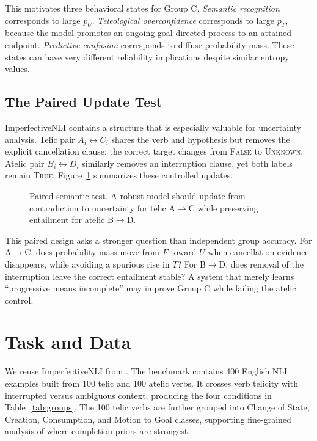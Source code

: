 \documentclass[letterpaper]{article}
\begin{document}
This motivates three behavioral states for Group C. \emph{Semantic recognition} corresponds to large $p_U$. \emph{Teleological overconfidence} corresponds to large $p_T$, because the model promotes an ongoing goal-directed process to an attained endpoint. \emph{Predictive confusion} corresponds to diffuse probability mass. These states can have very different reliability implications despite similar entropy values.

\subsection{The Paired Update Test}
ImperfectiveNLI contains a structure that is especially valuable for uncertainty analysis. Telic pair $A_i\leftrightarrow C_i$ shares the verb and hypothesis but removes the explicit cancellation clause: the correct target changes from \textsc{False} to \textsc{Unknown}. Atelic pair $B_i\leftrightarrow D_i$ similarly removes an interruption clause, yet both labels remain \textsc{True}. Figure~\ref{fig:pairwise} summarizes these controlled updates.

\begin{figure}[t]
\centering
\resizebox{\columnwidth}{!}{}
\caption{Paired semantic test. A robust model should update from contradiction to uncertainty for telic A$\rightarrow$C while preserving entailment for atelic B$\rightarrow$D.}
\label{fig:pairwise}
\end{figure}

This paired design asks a stronger question than independent group accuracy. For A$\rightarrow$C, does probability mass move from $F$ toward $U$ when cancellation evidence disappears, while avoiding a spurious rise in $T$? For B$\rightarrow$D, does removal of the interruption leave the correct entailment stable? A system that merely learns ``progressive means incomplete'' may improve Group C while failing the atelic control.

\section{Task and Data}
We reuse ImperfectiveNLI from \citet{ma-miyao-2026-imperfective}. The benchmark contains 400 English NLI examples built from 100 telic and 100 atelic verbs. It crosses verb telicity with interrupted versus ambiguous context, producing the four conditions in Table~\ref{tab:groups}. The 100 telic verbs are further grouped into Change of State, Creation, Consumption, and Motion to Goal classes, supporting fine-grained analysis of where completion priors are strongest.
\end{document}
